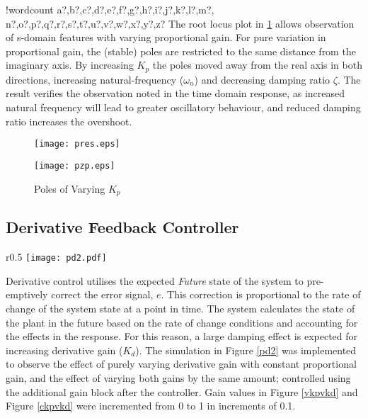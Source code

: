 \documentclass[11pt]{article}
\newcounter{words}
\newenvironment{counted}{%
  \setcounter{words}{0}
  \SearchList!{wordcount}{\stepcounter{words}}
    {a?,b?,c?,d?,e?,f?,g?,h?,i?,j?,k?,l?,m?,
    n?,o?,p?,q?,r?,s?,t?,u?,v?,w?,x?,y?,z?}
  \UndoBoundary{'}
  \SearchOrder{p;}}{%
  \StopSearching}
\begin{document}
\begin{counted}
The root locus plot in \ref{pzp} allows observation of s-domain features
with varying proportional gain. For pure variation in proportional gain,
the (stable) poles are restricted to the same distance from the
imaginary axis. By increasing \(K_p\) the poles moved away from the real
axis in both directions, increasing natural-frequency (\(\omega_n\)) and
decreasing damping ratio \(\zeta\). The result verifies the observation
noted in the time domain response, as increased natural frequency will
lead to greater oscillatory behaviour, and reduced damping ratio
increases the overshoot.

\begin{figure}[H]
\centering
\begin{minipage}{.455\textwidth}
 \centering
 \texttt{[image: pres.eps]}
 \caption{Response of Varying $K_p$}
 \label{pres}
\end{minipage}
\hfill
\begin{minipage}{.5\textwidth}
\centering
\texttt{[image: pzp.eps]}
\caption{Poles of Varying $K_p$}
\label{pzp}
\end{minipage}
\vspace{-20pt}
\end{figure}

\subsection{Derivative Feedback
Controller}\label{derivative-feedback-controller}

\begin{wrapfigure}{r}{0.5\textwidth}
\centering
\vspace{-35pt} %
\texttt{[image: pd2.pdf]}
\vspace{-10pt}
\caption{PD Feedback Controller}
\label{pd2}
\vspace{-25pt}
\end{wrapfigure}

Derivative control utilises the expected \emph{Future} state of the
system to pre-emptively correct the error signal, \(e\). This correction
is proportional to the rate of change of the system state at a point in
time. The system calculates the state of the plant in the future based
on the rate of change conditions and accounting for the effects in the
response. For this reason, a large damping effect is expected for
increasing derivative gain (\(K_d\)). The simulation in Figure \ref{pd2}
was implemented to observe the effect of purely varying derivative gain
with constant proportional gain, and the effect of varying both gains by
the same amount; controlled using the additional gain block after the
controller. Gain values in Figure \ref{vkpvkd} and Figure \ref{ckpvkd}
were incremented from 0 to 1 in increments of 0.1.


\end{counted}
\end{document}
